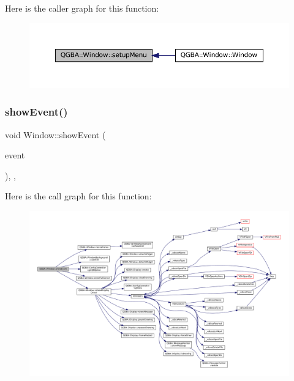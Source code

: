 Here is the caller graph for this function\+:
\nopagebreak
\begin{figure}[H]
\begin{center}
\leavevmode
\includegraphics[width=350pt]{class_q_g_b_a_1_1_window_a529d32e64893056a7307db1ccfd10df9_icgraph}
\end{center}
\end{figure}
\mbox{\label{class_q_g_b_a_1_1_window_a3b5f624c58beca8a034de91f9ce8df13}} 
\subsubsection{\texorpdfstring{show\+Event()}{showEvent()}}
{\footnotesize\ttfamily void Window\+::show\+Event (\begin{DoxyParamCaption}\item[{Q\+Show\+Event $\ast$}]{event }\end{DoxyParamCaption})\hspace{0.3cm}{\ttfamily [override]}, {\ttfamily [protected]}, {\ttfamily [virtual]}}

Here is the call graph for this function\+:
\nopagebreak
\begin{figure}[H]
\begin{center}
\leavevmode
\includegraphics[width=350pt]{class_q_g_b_a_1_1_window_a3b5f624c58beca8a034de91f9ce8df13_cgraph}
\end{center}
\end{figure}
\mbox{\label{class_q_g_b_a_1_1_window_ace8436461a769c9d941c8cbcf82cf79f}} 
